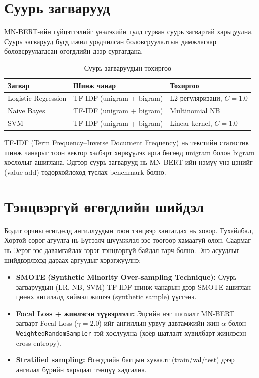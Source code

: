 \section{Суурь загварууд}

MN-BERT-ийн гүйцэтгэлийг үнэлэхийн тулд гурван суурь загвартай харьцуулна.
Суурь загварууд бүгд ижил урьдчилсан боловсруулалтын дамжлагаар боловсруулагдсан
өгөгдлийн дээр сургагдана.

\begin{table}[H]
\centering
\caption{Суурь загваруудын тохиргоо}
\label{tab:baseline-config}
\begin{tabular}{@{}lll@{}}
\toprule
\textbf{Загвар} & \textbf{Шинж чанар} & \textbf{Тохиргоо} \\
\midrule
Logistic Regression & TF-IDF (unigram + bigram) & L2 регуляризаци, $C=1.0$ \\
Naive Bayes         & TF-IDF (unigram + bigram) & Multinomial NB \\
SVM                 & TF-IDF (unigram + bigram) & Linear kernel, $C=1.0$ \\
\bottomrule
\end{tabular}
\end{table}

TF-IDF (Term Frequency--Inverse Document Frequency) нь текстийн статистик
шинж чанарыг тоон вектор хэлбэрт хөрвүүлэх арга бөгөөд unigram болон bigram
хослолыг ашиглана. Эдгээр суурь загварууд нь MN-BERT-ийн нэмүү үнэ цэнийг
(value-add) тодорхойлоход туслах benchmark болно.

\section{Тэнцвэргүй өгөгдлийн шийдэл}

Бодит орчны өгөгдөлд ангиллуудын тоон тэнцвэр хангагдах нь ховор. Тухайлбал,
Хортой сөрөг агуулга нь Бүтээлч шүүмжлэл-ээс тоогоор хамаагүй олон, Саармаг нь Эерэг-ээс
давамгайлах зэрэг тэнцвэргүй байдал гарч болно. Энэ асуудлыг шийдвэрлэхэд
дараах аргуудыг хэрэгжүүлнэ:

\begin{itemize}
  \item \textbf{SMOTE (Synthetic Minority Over-sampling Technique):} Суурь
        загваруудын (LR, NB, SVM) TF-IDF шинж чанарын дээр SMOTE ашиглан
        цөөнх ангилалд хиймэл жишээ (synthetic sample) үүсгэнэ.
  \item \textbf{Focal Loss + жинлэсэн түүвэрлэлт:} Эцсийн нэг шатлалт MN-BERT
        загварт Focal Loss ($\gamma{=}2.0$)-ийг ангиллын урвуу давтамжийн жин
        $\alpha$ болон \texttt{WeightedRandomSampler}-тэй хослуулна (хоёр шатлалт
        хувилбарт жинлэсэн cross-entropy).
  \item \textbf{Stratified sampling:} Өгөгдлийн багцын хуваалт (train/val/test) дээр
        ангилал бүрийн харьцааг тэнцүү хадгална.
\end{itemize}

